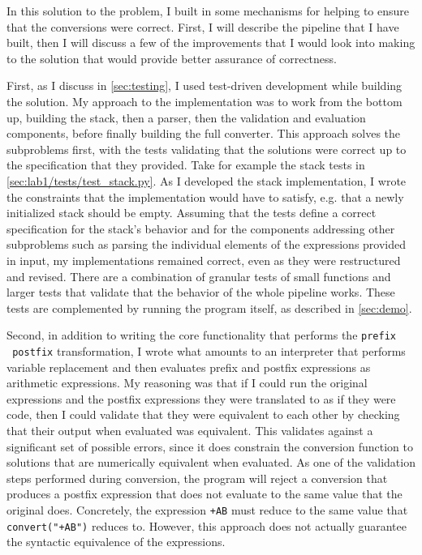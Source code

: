 \documentclass[10pt,letterpaper,final]{report}
\begin{document}
In this solution to the problem, I built in some mechanisms for helping to ensure that the conversions were correct. First, I will describe the pipeline that I have built, then I will discuss a few of the improvements that I would look into making to the solution that would provide better assurance of correctness.

First, as I discuss in \autoref{sec:testing}, I used test-driven development while building the solution. My approach to the implementation was to work from the bottom up, building the stack, then a parser, then the validation and evaluation components, before finally building the full converter. This approach solves the subproblems first, with the tests validating that the solutions were correct up to the specification that they provided. Take for example the stack tests in \autoref{sec:lab1/tests/test_stack.py}. As I developed the stack implementation, I wrote the constraints that the implementation would have to satisfy, e.g. that a newly initialized stack should be empty. Assuming that the tests define a correct specification for the stack's behavior and for the components addressing other subproblems such as parsing the individual elements of the expressions provided in input, my implementations remained correct, even as they were restructured and revised. There are a combination of granular tests of small functions and larger tests that validate that the behavior of the whole pipeline works. These tests are complemented by running the program itself, as described in \autoref{sec:demo}.

Second, in addition to writing the core functionality that performs the \texttt{prefix \to\ postfix} transformation, I wrote what amounts to an interpreter that performs variable replacement and then evaluates prefix and postfix expressions as arithmetic expressions. My reasoning was that if I could run the original expressions and the postfix expressions they were translated to as if they were code, then I could validate that they were equivalent to each other by checking that their output when evaluated was equivalent. This validates against a significant set of possible errors, since it does constrain the conversion function to solutions that are numerically equivalent when evaluated. As one of the validation steps performed during conversion, the program will reject a conversion that produces a postfix expression that does not evaluate to the same value that the original does. Concretely, the expression \texttt{+AB} must reduce to the same value that \texttt{convert("+AB")} reduces to. However, this approach does not actually guarantee the syntactic equivalence of the expressions.
\end{document}
